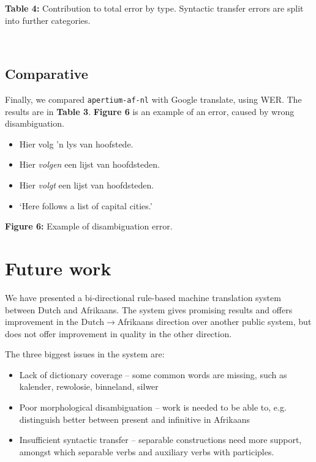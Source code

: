 \documentclass[a0,landscape]{a0poster}
\begin{document}
\begin{multicols}{4}
\begin{minipage}[b]{25cm}
\begin{center}
  \end{center}  
     \textbf{Table 4:} Contribution to total error by type. Syntactic transfer errors are split into 
      further categories.
    
\end{minipage}\\

\subsection{Comparative}
Finally, we compared {\small {\tt apertium-af-nl}} with Google translate, using WER. The results 
are in {\bf Table 3}. {\bf Figure 6} is an example of an error, caused by wrong disambiguation. \\

\begin{itemize}
    \item[] Hier volg 'n lys van hoofstede. 
    \item[] Hier {\em volgen} een lijst van hoofdsteden. 
    \item[] Hier {\em volgt} een lijst van hoofdsteden.  
    \item[] `Here follows a list of capital cities.' 
\end{itemize}
\textbf{Figure 6:} Example of disambiguation error.

\section{Future work}
We have presented a bi-directional rule-based machine translation system between Dutch and Afrikaans.
The system gives promising results and offers improvement in the Dutch$\rightarrow$Afrikaans direction
over another public system, but does not offer improvement in quality in the other direction.

The three biggest issues in the system are:
\begin{itemize}
 \item Lack of dictionary coverage -- some common words are missing, such as kalender, rewolosie, binneland, silwer
 \item Poor morphological disambiguation -- work is needed to be able to, e.g. distinguish better between present and infinitive in Afrikaans
 \item Insufficient syntactic transfer -- separable constructions need more support, amongst which separable verbs and auxiliary verbs with participles.
\end{itemize}


\end{multicols}
\end{document}
